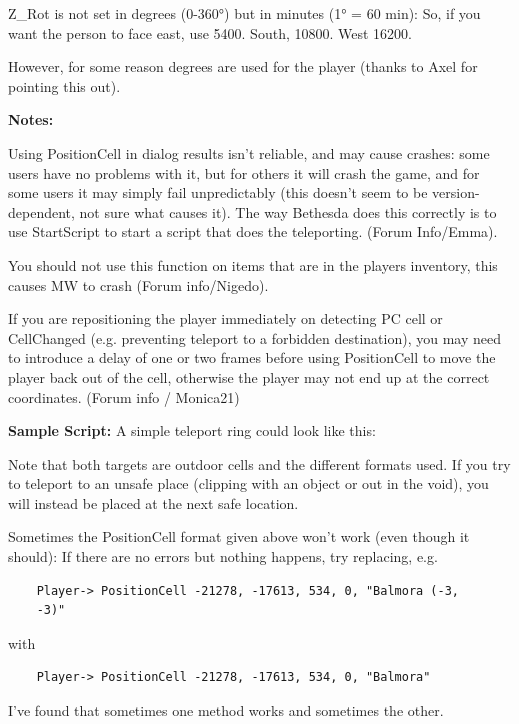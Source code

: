 Z\_Rot is not set in degrees (0-360°) but in minutes (1° = 60 min): So,
if you want the person to face east, use 5400. South, 10800. West 16200.

However, for some reason degrees are used for the player (thanks to Axel
for pointing this out).

\textbf{Notes:}

Using PositionCell in dialog results isn't reliable, and may cause
crashes: some users have no problems with it, but for others it will
crash the game, and for some users it may simply fail unpredictably
(this doesn't seem to be version-dependent, not sure what causes it).
The way Bethesda does this correctly is to use StartScript to start a
script that does the teleporting. (Forum Info/Emma).

You should not use this function on items that are in the players
inventory, this causes MW to crash (Forum info/Nigedo).

If you are repositioning the player immediately on detecting PC cell or
CellChanged (e.g. preventing teleport to a forbidden destination), you
may need to introduce a delay of one or two frames before using
PositionCell to move the player back out of the cell, otherwise the
player may not end up at the correct coordinates. (Forum info /
Monica21)

\textbf{Sample Script:} A simple teleport ring could look like this:



Note that both targets are outdoor cells and the different formats used.
If you try to teleport to an unsafe place (clipping with an object or
out in the void), you will instead be placed at the next safe location.

Sometimes the PositionCell format given above won't work (even though it
should): If there are no errors but nothing happens, try replacing, e.g.

\begin{lstlisting}
	Player-> PositionCell -21278, -17613, 534, 0, "Balmora (-3,
	-3)"
\end{lstlisting}

with

\begin{lstlisting}
	Player-> PositionCell -21278, -17613, 534, 0, "Balmora"
\end{lstlisting}

I've found that sometimes one method works and sometimes the other.

